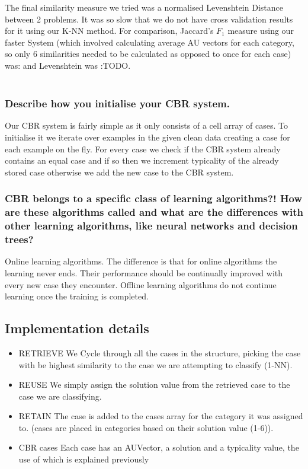 \documentclass[12pt]{article}
\begin{document}
The final similarity measure we tried was a normalised Levenshtein Distance between 2 problems. It was so slow that we do not have cross validation results for it using our K-NN method. For comparison, Jaccard's $F_1$ measure using our faster System (which involved calculating average AU vectors for each category, so only 6 similarities needed to be calculated as opposed to once for each case) was: and Levenshtein was :TODO. \\ \\

\subsubsection*{Describe how you initialise your CBR system.}

Our CBR system is fairly simple as it only consists of a cell array of cases. To initialise it we iterate over examples in the given clean data creating a case for each example on the fly. For every case we check if the CBR system already contains an equal case and if so then we increment typicality of the already stored case otherwise we add the new case to the CBR system.

\subsubsection*{CBR belongs to a specific class of learning algorithms?! How are these algorithms called and what are the differences with other learning algorithms, like neural networks and decision trees?}

Online learning algorithms. The difference is that for online algorithms the learning never ends. Their performance should be continually improved with every new case they encounter. Offline learning algorithms do not continue learning once the training is completed.


\subsection*{Implementation details}
\begin{itemize}
  \item RETRIEVE
    We Cycle through all the cases in the structure, picking the case with be highest similarity to the case we are attempting to classify (1-NN).
  \item REUSE
    We simply assign the solution value from the retrieved case to the case we are classifying.
  \item RETAIN
    The case is added to the cases array for the category it was assigned to. (cases are placed in categories based on their solution value (1-6)).
  \item CBR cases
    Each case has an AUVector, a solution and a typicality value, the use of which is explained previously
\end{itemize}
\end{document}
